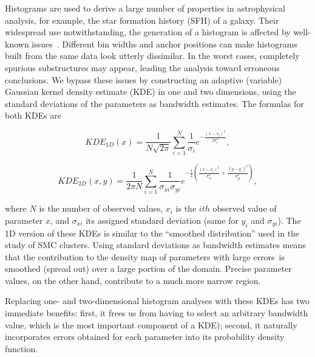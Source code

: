 \documentclass[draft]{aa}
\begin{document}
Histograms are used to derive a large number of properties in astrophysical
analysis, for example, the star formation history (SFH) of a galaxy.
%
Their widespread use notwithstanding, the generation of a histogram is affected
by well-known issues~\citep[see][]{Silverman_1986,Simonoff_1997}.
Different bin widths and anchor positions can make histograms built from the
same data look utterly dissimilar. In the worst cases, completely spurious
substructures may appear, leading the analysis toward erroneous conclusions.
%
We bypass these issues by constructing an adaptive (variable) Gaussian kernel
density estimate (KDE) in one and two dimensions, using the standard
deviations of the parameters as bandwidth estimates. The formulas for both KDEs are

\begin{equation}
KDE_{1D}(x) = \frac{1}{N\sqrt{2\pi}} \sum_{i=1}^N \frac{1}{\sigma_i}
e^{-\frac{(x-x_i)^2}{2\sigma_i^2}},
\label{eq:kde-1d}
\end{equation}

\begin{equation}
KDE_{2D}(x,y) = \frac{1}{2\pi N} \sum_{i=1}^N \frac{1}{\sigma_{xi}\sigma_{yi}}
e^{-\frac{1}{2} \left( \frac{(x-x_i)^2}{\sigma_{xi}^2} + 
\frac{(y-y_i)^2}{\sigma_{yi}^2} \right)},
\label{eq:kde-2d}
\end{equation}

\noindent where $N$ is the number of observed values, $x_i$ is the $ith$
observed value of parameter $x$, and $\sigma_{xi}$ its assigned standard
deviation (same for $y_i$ and $\sigma_{yi}$). The 1D version of these KDEs is
similar to the ``smoothed distribution'' used in the~\cite{Rafelski_2005} study
of SMC clusters.
%
Using standard deviations as bandwidth estimates means that the contribution to
the density map of parameters with large errors\ is smoothed (spread out) over
a large portion of the domain. Precise parameter values, on the other
hand, contribute to a much more narrow region.

Replacing one- and two-dimensional histogram analyses with these KDEs has two
immediate benefits: first, it frees us from having to select an arbitrary bandwidth
value, which is the most important component of a KDE);  second, it naturally incorporates
errors obtained for each parameter into its probability density function.
%
\end{document}
